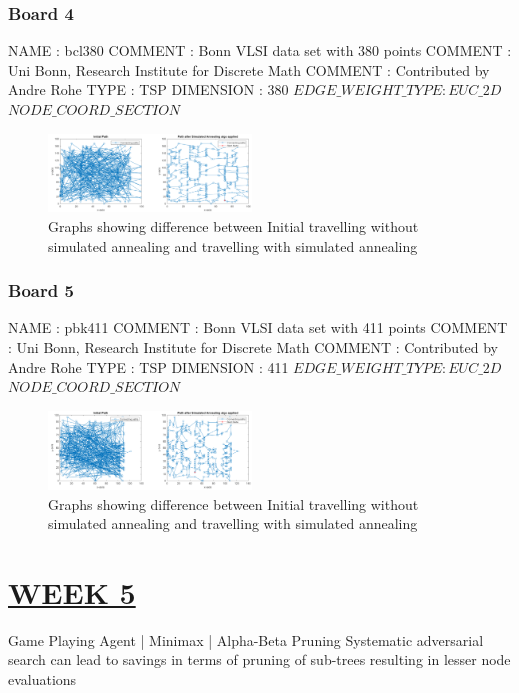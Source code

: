 \documentclass[15pt,journal]{IEEEtran}
\begin{document}
\subsubsection{\bf{Board 4}}
NAME : bcl380
COMMENT : Bonn VLSI data set with 380 points
COMMENT : Uni Bonn, Research Institute for Discrete Math
COMMENT : Contributed by Andre Rohe
TYPE : TSP
DIMENSION : 380
$EDGE\_WEIGHT\_TYPE : EUC\_2D$
$NODE\_COORD\_SECTION$


\begin{figure}[H]%
\begin {center}
\includegraphics[width=0.48\textwidth]{images/_b4.PNG}
\caption{Graphs showing difference between Initial travelling without simulated annealing and travelling with simulated annealing} %
\label{fig:ecg}
\end {center}
\end{figure}

\subsubsection{\bf{Board 5}}
NAME : pbk411
COMMENT : Bonn VLSI data set with 411 points
COMMENT : Uni Bonn, Research Institute for Discrete Math
COMMENT : Contributed by Andre Rohe
TYPE : TSP
DIMENSION : 411
$EDGE\_WEIGHT\_TYPE : EUC\_2D$
$NODE\_COORD\_SECTION$

\begin{figure}[H]%
\begin {center}
\includegraphics[width=0.48\textwidth]{images/_b5.PNG}
\caption{Graphs showing difference between Initial travelling without simulated annealing and travelling with simulated annealing} %
\label{fig:ecg}
\end {center}
\end{figure}


 

\section{\large{\underline{WEEK 5}}}
Game Playing Agent | Minimax | Alpha-Beta Pruning
Systematic adversarial search can lead to savings in terms of pruning of sub-trees resulting in lesser node evaluations
\end{document}
